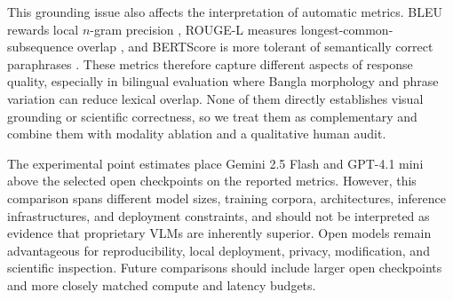 \documentclass{article}
\begin{document}
This grounding issue also affects the interpretation of automatic metrics. BLEU rewards local $n$-gram precision \citep{papineni2002bleu}, ROUGE-L measures longest-common-subsequence overlap \citep{lin2004rouge}, and BERTScore is more tolerant of semantically correct paraphrases \citep{zhang2020bertscore}. These metrics therefore capture different aspects of response quality, especially in bilingual evaluation where Bangla morphology and phrase variation can reduce lexical overlap. None of them directly establishes visual grounding or scientific correctness, so we treat them as complementary and combine them with modality ablation and a qualitative human audit.

The experimental point estimates place Gemini 2.5 Flash and GPT-4.1 mini above the selected open checkpoints on the reported metrics. However, this comparison spans different model sizes, training corpora, architectures, inference infrastructures, and deployment constraints, and should not be interpreted as evidence that proprietary VLMs are inherently superior. Open models remain advantageous for reproducibility, local deployment, privacy, modification, and scientific inspection. Future comparisons should include larger open checkpoints and more closely matched compute and latency budgets.

% 





\end{document}

